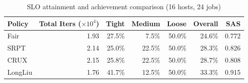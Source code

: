 \begin{table}[t]
\centering
\caption{SLO attainment and achievement comparison (16 hosts, 24 jobs)}
\label{tab:slo_16host}
\begin{tabular}{l|r|r|r|r|r|r}
\hline
Policy & Total Iters ($\times 10^4$) & Tight & Medium & Loose & Overall & SAS \\
\hline
Fair & 1.93 & 27.5\% & 7.5\% & 50.0\% & 24.6\% & 0.772 \\
SRPT & 2.14 & 25.0\% & 22.5\% & 50.0\% & 28.3\% & 0.826 \\
CRUX & 2.15 & 25.8\% & 22.5\% & 50.0\% & 28.7\% & 0.808 \\
LongLiu & 1.76 & 41.7\% & 12.5\% & 50.0\% & 33.3\% & 0.915 \\
\hline
\end{tabular}
\end{table}

